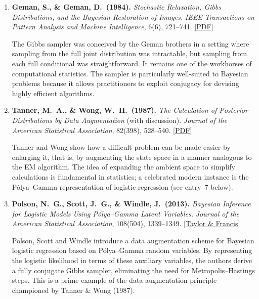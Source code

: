 \documentclass[12pt, a4paper]{article}
\begin{document}
\begin{enumerate}
Kirkpatrick and collaborators are among the groups credited with the invention of the simulated annealing (SA) method.
This paper showcases its application to the famously NP-hard travelling salesman problem.
A substantial line of subsequent research addressed the design of appropriate cooling schedules to avoid entrapment in local optima.

\item \textbf{Geman, S., \& Geman, D.\ (1984).}
\textit{Stochastic Relaxation, Gibbs Distributions, and the Bayesian Restoration of Images.}
\textit{IEEE Transactions on Pattern Analysis and Machine Intelligence}, 6(6), 721--741.
\href{http://www.cis.jhu.edu/publications/papers_in_database/GEMAN/GemanPAMI84.pdf}{[PDF]}

The Gibbs sampler was conceived by the Geman brothers in a setting where sampling from the full joint distribution was intractable, but sampling from each full conditional was straightforward.
It remains one of the workhorses of computational statistics.
The sampler is particularly well-suited to Bayesian problems because it allows practitioners to exploit conjugacy for devising highly efficient algorithms.

\item \textbf{Tanner, M.~A., \& Wong, W.~H.\ (1987).}
\textit{The Calculation of Posterior Distributions by Data Augmentation} (with discussion).
\textit{Journal of the American Statistical Association}, 82(398), 528--540.
\href{http://www.stat.cmu.edu/~brian/905-2009/all-papers/tanner-wong-1987-with-disc.pdf}{[PDF]}

Tanner and Wong show how a difficult problem can be made easier by enlarging it, that is, by augmenting the state space in a manner analogous to the EM algorithm.
The idea of expanding the ambient space to simplify calculations is fundamental in statistics; a celebrated modern instance is the P\'olya--Gamma representation of logistic regression (see entry~7 below).

\item \textbf{Polson, N.~G., Scott, J.~G., \& Windle, J.\ (2013).}
\textit{Bayesian Inference for Logistic Models Using P\'olya--Gamma Latent Variables.}
\textit{Journal of the American Statistical Association}, 108(504), 1339--1349.
\href{https://www.tandfonline.com/doi/abs/10.1080/01621459.2013.829001}{[Taylor \& Francis]}

Polson, Scott and Windle introduce a data augmentation scheme for Bayesian logistic regression based on P\'olya--Gamma random variables.
By representing the logistic likelihood in terms of these auxiliary variables, the authors derive a fully conjugate Gibbs sampler, eliminating the need for Metropolis--Hastings steps.
This is a prime example of the data augmentation principle championed by Tanner \& Wong (1987).


\end{enumerate}
\end{document}
